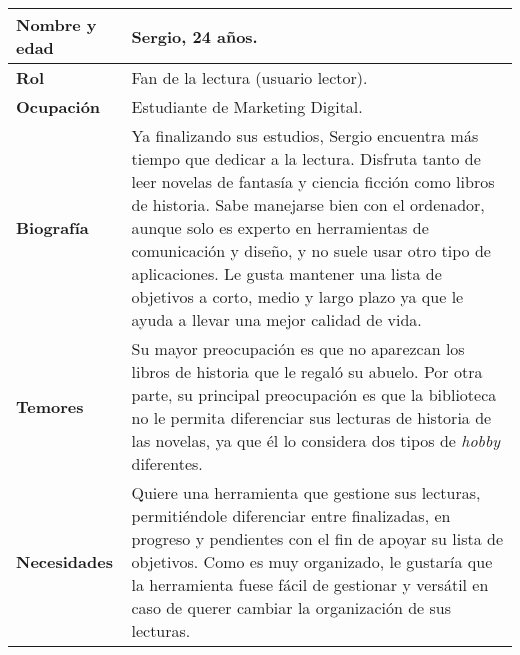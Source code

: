 \begin{table}[H]
    \centering
    \begin{tabularx}{\columnwidth}{|l|X|}
        \hline
        \textbf{Nombre y edad} & Sergio, 24 años. \\
        \hline
        \textbf{Rol} & Fan de la lectura (usuario lector). \\
        \hline
        \textbf{Ocupación} & Estudiante de Marketing Digital. \\
        \hline
        \textbf{Biografía} & Ya finalizando sus estudios, Sergio encuentra más tiempo que dedicar a la lectura. Disfruta tanto de leer novelas de fantasía y ciencia ficción como libros de historia. Sabe manejarse bien con el ordenador, aunque solo es experto en herramientas de comunicación y diseño, y no suele usar otro tipo de aplicaciones. Le gusta mantener una lista de objetivos a corto, medio y largo plazo ya que le ayuda a llevar una mejor calidad de vida. \\
        \hline
        \textbf{Temores} & Su mayor preocupación es que no aparezcan los libros de historia que le regaló su abuelo. Por otra parte, su principal preocupación es que la biblioteca no le permita diferenciar sus lecturas de historia de las novelas, ya que él lo considera dos tipos de \textit{hobby} diferentes. \\
        \hline
        \textbf{Necesidades} & Quiere una herramienta que gestione sus lecturas, permitiéndole diferenciar entre finalizadas, en progreso y pendientes con el fin de apoyar su lista de objetivos. Como es muy organizado, le gustaría que la herramienta fuese fácil de gestionar y versátil en caso de querer cambiar la organización de sus lecturas. \\
        \hline
    \end{tabularx}
\end{table}

